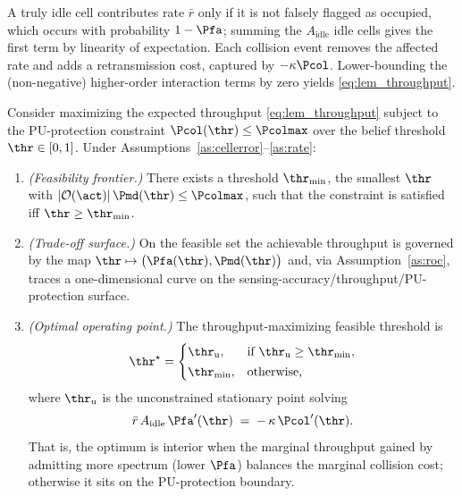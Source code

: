 \begin{IEEEproof}
A truly idle cell contributes rate $\bar{r}$ only if it is not falsely
flagged as occupied, which occurs with probability $1-\Pfa$; summing the
$A_{\mathrm{idle}}$ idle cells gives the first term by linearity of
expectation. Each collision event removes the affected rate and adds a
retransmission cost, captured by $-\kappa\Pcol$. Lower-bounding the
(non-negative) higher-order interaction terms by zero yields
\eqref{eq:lem_throughput}.
\end{IEEEproof}

\begin{theorem}
\label{thm:tradeoff}
Consider maximizing the expected throughput \eqref{eq:lem_throughput} subject
to the PU-protection constraint $\Pcol(\thr)\le\Pcolmax$ over the belief
threshold $\thr\in[0,1]$. Under Assumptions~\ref{as:cellerror}--\ref{as:rate}:
\begin{enumerate}
\item[(i)] \emph{(Feasibility frontier.)} There exists a threshold
$\thr_{\min}$, the smallest $\thr$ with
$|\mathcal{O}(\act)|\,\Pmd(\thr)\le\Pcolmax$, such that the constraint is
satisfied iff $\thr\ge\thr_{\min}$.
\item[(ii)] \emph{(Trade-off surface.)} On the feasible set the achievable
throughput is governed by the map
$\thr\mapsto\bigl(\Pfa(\thr),\Pmd(\thr)\bigr)$ and, via
Assumption~\ref{as:roc}, traces a one-dimensional curve on the
sensing-accuracy/throughput/PU-protection surface.
\item[(iii)] \emph{(Optimal operating point.)} The throughput-maximizing
feasible threshold is
\begin{equation}
\thr^{\star}=
\begin{cases}
\thr_{\mathrm{u}}, & \text{if } \thr_{\mathrm{u}}\ge\thr_{\min},\\[2pt]
\thr_{\min}, & \text{otherwise,}
\end{cases}
\label{eq:thmA_opt}
\end{equation}
where $\thr_{\mathrm{u}}$ is the unconstrained stationary point solving
\begin{equation}
\bar{r}\,A_{\mathrm{idle}}\,\Pfa'(\thr)
\;=\;-\,\kappa\,\Pcol'(\thr).
\label{eq:thmA_foc}
\end{equation}
That is, the optimum is interior when the marginal throughput gained by
admitting more spectrum (lower $\Pfa$) balances the marginal collision cost;
otherwise it sits on the PU-protection boundary.
\end{enumerate}
\end{theorem}

